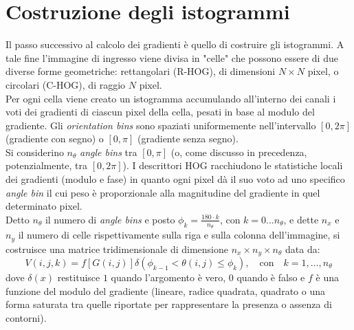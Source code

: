 \section{Costruzione degli istogrammi}
Il passo successivo al calcolo dei gradienti è quello di costruire gli istogrammi. A tale fine l'immagine di ingresso viene divisa in "celle" che possono essere di due diverse forme geometriche: rettangolari (R-HOG), di dimensioni $N\times N $ pixel, o circolari (C-HOG), di raggio $N$ pixel.\\
Per ogni cella viene creato un istogramma accumulando all'interno dei canali i voti dei gradienti di ciascun pixel della cella, pesati in base al modulo del gradiente. 
Gli \emph{orientation bins} sono spaziati uniformemente nell'intervallo $[0, 2\pi]$ (gradiente con segno) o $[0, \pi]$ (gradiente senza segno).\\ 
Si considerino $n_{\theta}$ \emph{angle bins} tra $[0,\pi]$ (o, come discusso in precedenza, potenzialmente, tra $[0,2\pi]$).
I descrittori HOG racchiudono le statistiche locali dei gradienti (modulo e fase) in quanto ogni pixel dà il suo voto ad uno specifico \emph{angle bin} il cui peso è proporzionale alla magnitudine del gradiente in quel determinato pixel. 
\\
Detto $ n_{\theta}$ il numero di \emph{angle bins} e posto ${\phi_{k}}={\frac{180 \cdot k}{n_{\theta}}}$, con $k=0...n_{\theta}$, e dette $n_{x}$ e $n_{y}$ il numero di celle rispettivamente sulla riga e sulla colonna dell'immagine, si costruisce una matrice tridimensionale di dimensione $n_{x}\times n_{y} \times n_{\theta}$ data da:
\begin{equation}
\label{eq:euquazione_matrice_voti}
V(i,j,k)=f\left [G(i,j)\right ]\delta(\phi_{k-1} <\theta(i,j) \leq\phi_{k}), \quad \text{con} \quad k=1,\ldots,n_{\theta}
\end{equation}
dove $ \delta(x)$ restituisce $1$ quando l'argomento è vero, $0$ quando è falso e $f$ è una funzione del modulo del gradiente (lineare, radice quadrata, quadrato o una forma saturata tra quelle riportate per rappresentare la presenza o assenza di contorni).


